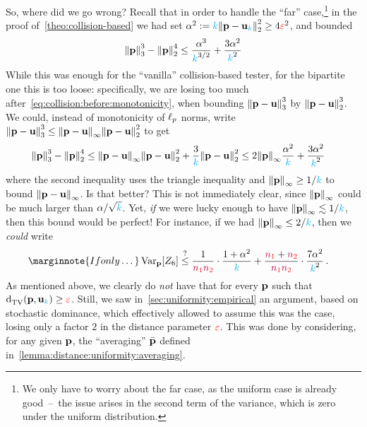 So, where did we go wrong? Recall that in order to handle the ``far'' case,\footnote{We only have to worry about the far case, as the uniform case is already good~--~the issue arises in the second term of the variance, which is zero under the uniform distribution.} in the proof of~\cref{theo:collision-based} we had set $\alpha^2 \eqdef \ab\normtwo{\p-\uniform_\ab}^2 \geq 4\dst^2$, and bounded
\[
    \norm{\p}_3^3-\normtwo{\p}^4 \leq \frac{\alpha^{3}}{\ab^{3/2}} + \frac{3\alpha^2}{\ab^2}
\]
While this was enough for the ``vanilla'' collision-based tester, for the bipartite one this is too loose: specifically, we are losing too much after~\cref{eq:collision:before:monotonicity}, when bounding
$\norm{\p-\uniform}_3^3$ by $\normtwo{\p-\uniform}^3$. We could, instead of monotonicity of $\lp[p]$ norms, write
$\norm{\p-\uniform}_3^3 \leq \norminf{\p-\uniform}\normtwo{\p-\uniform}^2$ to get
    \begin{align*}
        \norm{\p}_3^3-\normtwo{\p}^4
        &\leq \norminf{\p-\uniform}\normtwo{\p-\uniform}^2 + \frac{3}{\ab}\normtwo{\p-\uniform}^2
        \leq 2\norminf{\p}\frac{\alpha^{2}}{\ab} + \frac{3\alpha^2}{\ab^2}
    \end{align*}
where the second inequality uses the triangle inequality and $\norminf{\p}\geq 1/\ab$ to bound $\norminf{\p-\uniform}$. Is that better? This is not immediately clear, since $\norminf{\p}$ could be much larger than $\alpha/\sqrt{\ab}$. Yet, \emph{if} we were lucky enough to have $\norminf{\p}\lesssim 1/\ab$, then this bound would be perfect! For instance, if we had $\norminf{\p}\leq 2/\ab$, then we \emph{could} write
\begin{align}\marginnote{If only\dots}
  \Var_\p[Z_6]
  &\stackrel{?}{\leq} \frac{1}{\nss\nst}\cdot \frac{1+\alpha^2}{\ab} + \frac{\nss+\nst}{\nss\nst}\cdot \frac{7\alpha^2}{\ab^2} \label{eq:var:bipartite:collisions:lowinfty}\,.
\end{align}
As mentioned above, we clearly do \emph{not} have that for every $\p$ such that $\totalvardist{\p}{\uniform_\ab}\geq \dst$. Still, we saw in~\cref{sec:uniformity:empirical} an argument, based on stochastic dominance, which effectively allowed to assume this was the case, losing only a factor $2$ in the distance parameter $\dst$. This was done by considering, for any given $\p$, the ``averaging'' $\bar{\p}$ defined in~\cref{lemma:distance:uniformity:averaging}.

